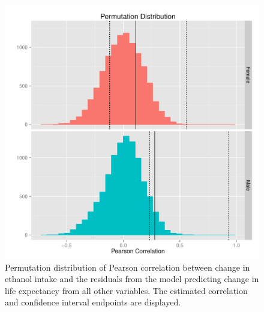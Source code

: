 \documentclass{article}
\begin{document}
\begin{figure}
\centering
\includegraphics[width = \textwidth]{permdistribution_etoh.pdf}
\caption{Permutation distribution of Pearson correlation between change in ethanol intake and the residuals from the model predicting change in life expectancy from all other variables. The estimated correlation and confidence interval endpoints are displayed.}\label{fig:etoh_CI}
\end{figure}
\end{document}
